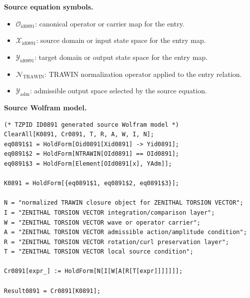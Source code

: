 \begin{minipage}[t]{0.49\linewidth}
\begingroup
\small
\raggedright
\textbf{Source equation symbols.}\par
\begin{itemize}[leftmargin=1.35em,itemsep=1pt,topsep=1pt,parsep=0pt]
    \item $\mathcal{O}_{\mathrm{id0891}}$: canonical operator or carrier map for the entry.
    \item $\mathcal{X}_{\mathrm{id0891}}$: source domain or input state space for the entry map.
    \item $\mathcal{Y}_{\mathrm{id0891}}$: target domain or output state space for the entry map.
    \item $\mathcal{N}_{\mathrm{TRAWIN}}$: TRAWIN normalization operator applied to the entry relation.
    \item $\mathcal{Y}_{\mathrm{adm}}$: admissible output space selected by the source equation.
\end{itemize}
\endgroup
\end{minipage}\hfill
\begin{minipage}[t]{0.47\linewidth}
\begingroup
\scriptsize
\raggedright
\textbf{Source Wolfram model.}\par
\begin{Verbatim}[fontsize=\tiny,breaklines=true,breakanywhere=true]
(* TZPID ID0891 generated source Wolfram model *)
ClearAll[K0891, Cr0891, T, R, A, W, I, N];
eq0891$1 = HoldForm[Oid0891[Xid0891] -> Yid0891];
eq0891$2 = HoldForm[NTRAWIN[OId0891] == OId0891];
eq0891$3 = HoldForm[Element[OId0891[x], YAdm]];

K0891 = HoldForm[{eq0891$1, eq0891$2, eq0891$3}];

N = "normalized TRAWIN closure object for ZENITHAL TORSION VECTOR";
I = "ZENITHAL TORSION VECTOR integration/comparison layer";
W = "ZENITHAL TORSION VECTOR wave or operator carrier";
A = "ZENITHAL TORSION VECTOR admissible action/amplitude condition";
R = "ZENITHAL TORSION VECTOR rotation/curl preservation layer";
T = "ZENITHAL TORSION VECTOR local source condition";

Cr0891[expr_] := HoldForm[N[I[W[A[R[T[expr]]]]]]];

Result0891 = Cr0891[K0891];
\end{Verbatim}
\endgroup
\end{minipage}

